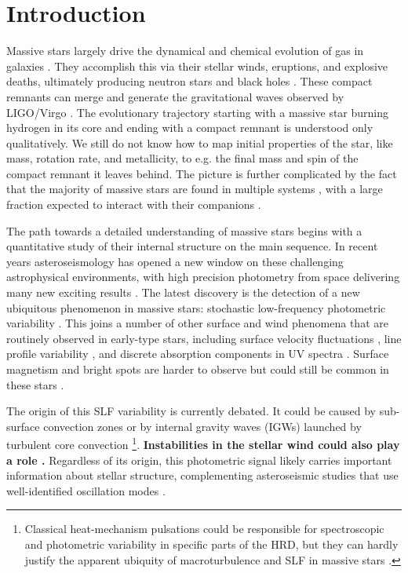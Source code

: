 \documentclass[twocolumn]{aastex63}
\begin{document}
\section{Introduction}\label{sec:introduction}
Massive stars largely drive the dynamical and chemical evolution of gas in galaxies \citep[e.g.][]{Hopkins:2014}. They accomplish this via their stellar winds, eruptions, and explosive deaths, ultimately producing neutron stars and black holes \citep{Langer:2012}.
These compact remnants can merge and generate the gravitational waves observed by LIGO/Virgo \citep{2016PhRvL.116f1102A}. The evolutionary trajectory starting with a massive star burning hydrogen in its core and ending with a compact remnant is understood only qualitatively. We still do not know how to map initial properties of the star, like mass, rotation rate, and metallicity, to e.g. the final mass and spin of the compact remnant it leaves behind. The picture is further complicated by the fact that the majority of massive stars are found in multiple systems \citep{Sana:2012}, with a large fraction expected to interact with their companions \citep{deMink:2014}. 

The path towards a detailed understanding of massive stars begins with a quantitative study of their internal structure on the main sequence. In recent years asteroseismology has opened a new window on these challenging astrophysical environments, with high precision photometry from space delivering many new exciting results \citep[e.g., MOST, CoRoT, BRITE, Kepler/K2 and TESS, see ][]{BowmanReview:2020}.
The latest discovery is the detection of a new ubiquitous phenomenon in massive stars: stochastic low-frequency photometric variability \citep[SLF variability;][]{Blomme:2011,2019NatAs...3..760B,Bowman:2019,Pedersen:2019,Bowman:2020,Rauw:2021}. 
This joins a number of other surface and wind phenomena that are routinely observed in early-type stars, including surface velocity fluctuations  \citep[Macroturbulence;][]{Simon-Diaz:2014}, line profile variability \citep{Fullerton:1996}, and discrete absorption components in UV spectra \citep{Howarth:1989,Cranmer:1996,Fullerton:1997,Kaper:1997}. Surface magnetism and bright spots are harder to observe but could still be common in these stars \citep[e.g.][]{Ramiaramanantsoa:2014}.

The origin of this SLF variability is currently debated.
It could be caused by sub-surface convection zones \citep{Cantiello:2009,Blomme:2011,Lecoanet:2020} or by internal gravity waves (IGWs) launched by turbulent core convection \citep{Edelmann:2019,Ratnasingam:2020}\footnote{Classical heat-mechanism pulsations could be responsible for
spectroscopic and photometric variability in specific parts of the HRD, but
they can hardly justify the apparent ubiquity of macroturbulence and SLF in
massive stars \citep{Godart:2017,Simon-Diaz:2017}.}. {\bf Instabilities in the stellar wind could also play a role \citep{Krticka:2021}.} 
Regardless of its origin, this photometric signal likely carries important information about stellar structure, complementing asteroseismic studies that use well-identified oscillation modes \citep[e.g.][]{Aerts:2019,Aerts_araa:2019,BowmanReview:2020}. 
\end{document}
